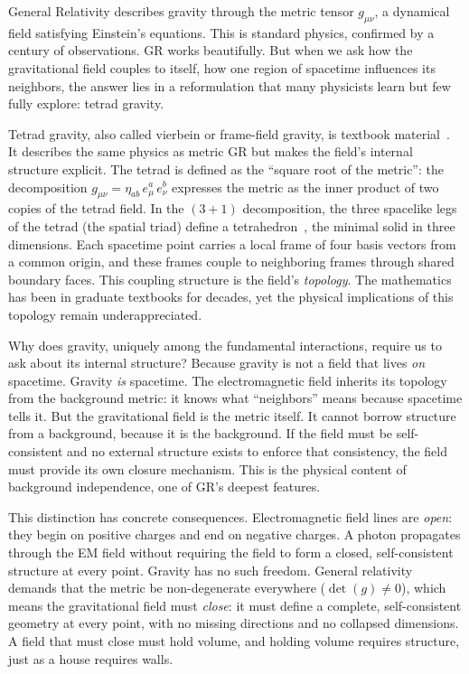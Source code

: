 \documentclass[aps,prd,preprint,superscriptaddress,showpacs,preprintnumbers,amsmath,amssymb,nofootinbib]{revtex4-2}
\begin{document}
General Relativity describes gravity through the metric tensor $g_{\mu\nu}$, a dynamical field satisfying Einstein's equations. This is standard physics, confirmed by a century of observations. GR works beautifully. But when we ask how the gravitational field couples to itself, how one region of spacetime influences its neighbors, the answer lies in a reformulation that many physicists learn but few fully explore: tetrad gravity.

Tetrad gravity, also called vierbein or frame-field gravity, is textbook material~\cite{mtw1973,wald1984}. It describes the same physics as metric GR but makes the field's internal structure explicit. The tetrad is defined as the ``square root of the metric'': the decomposition $g_{\mu\nu} = \eta_{ab}\,e^a_\mu\,e^b_\nu$ expresses the metric as the inner product of two copies of the tetrad field. In the $(3{+}1)$ decomposition, the three spacelike legs of the tetrad (the spatial triad) define a tetrahedron~\cite{barbieri1998}, the minimal solid in three dimensions. Each spacetime point carries a local frame of four basis vectors from a common origin, and these frames couple to neighboring frames through shared boundary faces. This coupling structure is the field's \emph{topology}. The mathematics has been in graduate textbooks for decades, yet the physical implications of this topology remain underappreciated.

Why does gravity, uniquely among the fundamental interactions, require us to ask about its internal structure? Because gravity is not a field that lives \emph{on} spacetime. Gravity \emph{is} spacetime. The electromagnetic field inherits its topology from the background metric: it knows what ``neighbors'' means because spacetime tells it. But the gravitational field is the metric itself. It cannot borrow structure from a background, because it is the background. If the field must be self-consistent and no external structure exists to enforce that consistency, the field must provide its own closure mechanism. This is the physical content of background independence, one of GR's deepest features.

This distinction has concrete consequences. Electromagnetic field lines are \emph{open}: they begin on positive charges and end on negative charges. A photon propagates through the EM field without requiring the field to form a closed, self-consistent structure at every point. Gravity has no such freedom. General relativity demands that the metric be non-degenerate everywhere ($\det(g) \neq 0$), which means the gravitational field must \emph{close}: it must define a complete, self-consistent geometry at every point, with no missing directions and no collapsed dimensions. A field that must close must hold volume, and holding volume requires structure, just as a house requires walls.
\end{document}
